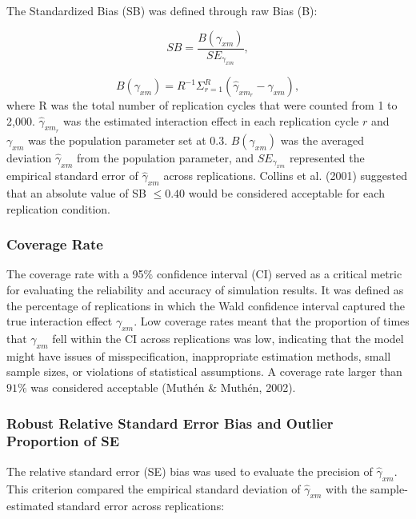 \documentclass[
  man]{apa6}
\begin{document}
The Standardized Bias (SB) was defined through raw Bias (B):

\begin{equation}
SB = \frac{B(\gamma_{xm})}{SE_{\gamma_{xm}}},
\end{equation}

\begin{equation}
B(\gamma_{xm}) = R^{-1}\Sigma^{R}_{r = 1}(\hat{\gamma}_{xm_{r}} - \gamma_{xm}),
\end{equation}
where R was the total number of replication cycles that were counted from 1 to 2,000. \(\hat{\gamma}_{xm_{r}}\) was the estimated interaction effect in each replication cycle \(r\) and \(\gamma_{xm}\) was the population parameter set at 0.3. \(B(\gamma_{xm})\) was the averaged deviation \(\hat{\gamma}_{xm}\) from the population parameter, and \(SE_{\gamma_{xm}}\) represented the empirical standard error of \(\hat{\gamma}_{xm}\) across replications. Collins et al. (2001) suggested that an absolute value of SB \(\le 0.40\) would be considered acceptable for each replication condition.

\hypertarget{coverage-rate}{%
\subsubsection{Coverage Rate}\label{coverage-rate}}

The coverage rate with a 95\(\%\) confidence interval (CI) served as a critical metric for evaluating the reliability and accuracy of simulation results. It was defined as the percentage of replications in which the Wald confidence interval captured the true interaction effect \(\gamma_{xm}\). Low coverage rates meant that the proportion of times that \(\gamma_{xm}\) fell within the CI across replications was low, indicating that the model might have issues of misspecification, inappropriate estimation methods, small sample sizes, or violations of statistical assumptions. A coverage rate larger than \(91\%\) was considered acceptable (Muthén \& Muthén, 2002).

\hypertarget{robust-relative-standard-error-bias-and-outlier-proportion-of-se}{%
\subsubsection{Robust Relative Standard Error Bias and Outlier Proportion of SE}\label{robust-relative-standard-error-bias-and-outlier-proportion-of-se}}

The relative standard error (SE) bias was used to evaluate the precision of \(\hat{\gamma}_{xm}\). This criterion compared the empirical standard deviation of \(\hat{\gamma}_{xm}\) with the sample-estimated standard error across replications:
\end{document}
